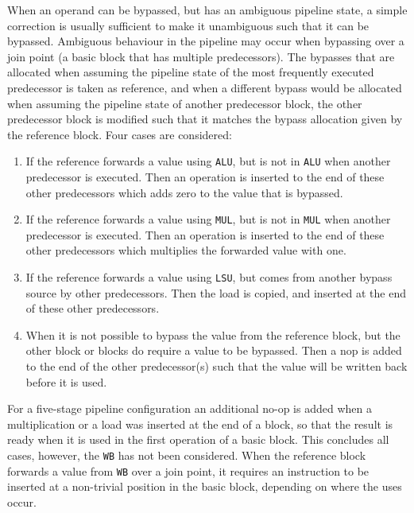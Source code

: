 When an operand can be bypassed, but has an ambiguous pipeline state, a simple correction is usually sufficient to make it unambiguous such that it can be bypassed. Ambiguous behaviour in the pipeline may occur when bypassing over a join point (a basic block that has multiple predecessors). The bypasses that are allocated when assuming the pipeline state of the most frequently executed predecessor is taken as reference, and when a different bypass would be allocated when assuming the pipeline state of another predecessor block, the other predecessor block is modified such that it matches the bypass allocation given by the reference block. Four cases are considered:

\begin{enumerate}
  \item If the reference forwards a value using \texttt{ALU}, but is not in \texttt{ALU} when another predecessor is executed. Then an operation is inserted to the end of these other predecessors which adds zero to the value that is bypassed.
  \item If the reference forwards a value using \texttt{MUL}, but is not in \texttt{MUL} when another predecessor is executed. Then an operation is inserted to the end of these other predecessors which multiplies the forwarded value with one.
  \item If the reference forwards a value using \texttt{LSU}, but comes from another bypass source by other predecessors. Then the load is copied, and inserted at the end of these other predecessors.
  \item When it is not possible to bypass the value from the reference block, but the other block or blocks do require a value to be bypassed. Then a nop is added to the end of the other predecessor(s) such that the value will be written back before it is used.
\end{enumerate}  

For a five-stage pipeline configuration an additional no-op is added when a multiplication or a load was inserted at the end of a block, so that the result is ready when it is used in the first operation of a basic block. This concludes all cases, however, the \texttt{WB} has not been considered. When the reference block forwards a value from \texttt{WB} over a join point, it requires an instruction to be inserted at a non-trivial position in the basic block, depending on where the uses occur. 



